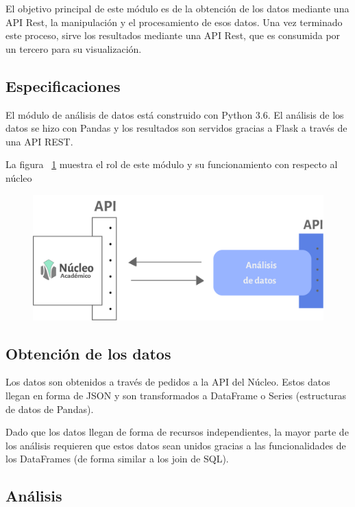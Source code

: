 El objetivo principal de este módulo es de la obtención de los datos mediante una API Rest, la manipulación y el procesamiento de esos datos. Una vez terminado este proceso, sirve los resultados mediante una API Rest, que es consumida por un tercero para su visualización.

\subsection{Especificaciones}

El módulo de análisis de datos está construido con Python 3.6. El análisis de los datos se hizo con Pandas y los resultados son servidos gracias a Flask a través de una API REST.


La figura ~\ref{fig:analisis-nucleo} muestra el rol de este módulo y su funcionamiento con respecto al núcleo

\begin{figure}[h!]
  \centering
    \includegraphics[scale=0.8]{images/analisis-datos/analisis-datos.png}
  \label{fig:analisis-nucleo}
\end{figure}

\subsection{Obtención de los datos}

Los datos son obtenidos a través de pedidos a la API del Núcleo. Estos datos llegan en forma de JSON y son transformados a DataFrame o Series (estructuras de datos de Pandas). 

Dado que los datos llegan de forma de recursos independientes, la mayor parte de los análisis requieren que estos datos sean unidos gracias a las funcionalidades de los DataFrames (de forma similar a los join de SQL).

\subsection{Análisis}

